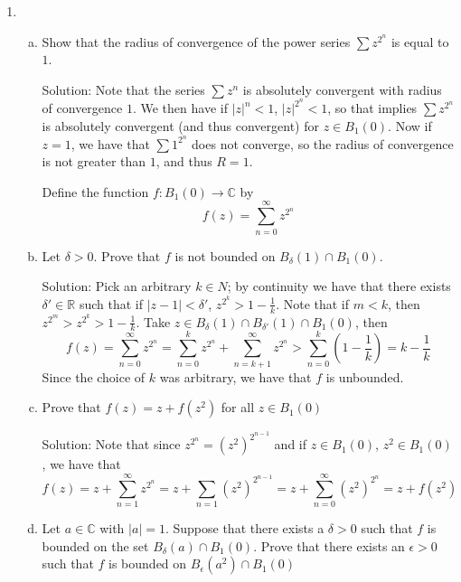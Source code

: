 \documentclass[11pt]{article}
\newcommand{\C}{\mathbb{C}}
\newcommand{\R}{\mathbb{R}}
\begin{document}
\begin{enumerate}[(1)]
\begin{enumerate}[(a)]
\end{enumerate}

\item \begin{enumerate}[(a)]
\item Show that the radius of convergence of the power series $\sum z^{2^n}$ is equal to $1$.

Solution: Note that the series $\sum z^n$ is absolutely convergent with radius of convergence $1$. We then have if $|z|^{n} < 1$, $|z|^{2^{n}} < 1$, so that implies $\sum z^{2^{n}}$ is absolutely convergent (and thus convergent) for $z \in B_1(0)$. Now if $z = 1$, we have that $\sum 1^{2^{n}}$ does not converge, so the radius of convergence is not greater than $1$, and thus $R = 1$.

\vspace{3mm}

Define the function $f: B_1(0) \to \C$ by 
$$ f(z) = \sum_{n=0}^{\infty}z^{2^n} $$



\item Let $\delta > 0$. Prove that $f$ is not bounded on $B_{\delta}(1) \cap B_1(0)$.

Solution: Pick an arbitrary $k \in N$; by continuity we have that there exists $\delta' \in \R$ such that if $|z-1| < \delta'$,  $z^{2^{k}} > 1 - \frac{1}{k}$. Note that if $m < k$, then $z^{2^{m}} > z^{2^k} > 1 - \frac{1}{k}$. Take $z \in B_{\delta}(1) \cap B_{\delta'}(1) \cap B_1(0)$, then
$$ f(z) = \sum_{n=0}^{\infty} z^{2^n} = \sum_{n=0}^{k} z^{2^n} + \sum_{n=k+1}^{\infty} z^{2^n} > \sum_{n=0}^{k} (1 - \frac{1}{k}) = k - \frac{1}{k} $$
Since the choice of $k$ was arbitrary, we have that $f$ is unbounded.

\vspace{3mm}

\item Prove that $f(z) = z + f(z^2)$ for all $z \in B_1(0)$

Solution: Note that since $z^{2^n} = (z^2)^{2^{n-1}}$ and if $z \in B_1(0)$, $z^2 \in B_1(0)$, we have that 
$$ f(z) = z + \sum_{n=1}^{\infty}z^{2^n} = z + \sum_{n=1}(z^2)^{2^{n-1}} = z + \sum_{n=0}^{\infty}(z^2)^{2^n} = z + f(z^2) $$

\item Let $a \in \C$ with $|a| = 1$. Suppose that there exists a $\delta > 0$ such that $f$ is bounded on the set $B_{\delta}(a) \cap B_1(0)$. Prove that there exists an $\epsilon > 0$ such that $f$ is bounded on $B_{\epsilon}(a^2)\cap B_1(0) $


\end{enumerate}
\end{enumerate}
\end{document}
